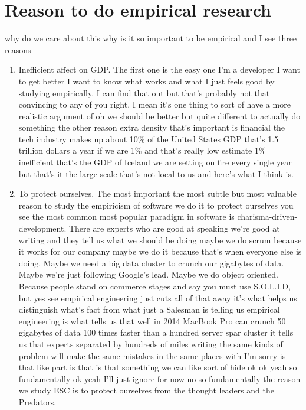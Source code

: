 \documentclass[conference, compsoc, twoside]{IEEEtran}
\begin{document}
\section{Reason to do empirical research} %
why do we care about this why is it so important to be empirical and I see three reasons
\begin{enumerate}
  \item Inefficient affect on GDP.
The first one is the easy one I'm a
developer I want to get better I want to
know what works and what I just feels
good by studying empirically.
I can find that out but that's probably not that convincing to any of you right.
I mean it's one thing to sort of have a more realistic argument of oh we should be better but quite different to actually do something the other reason extra density that's
important is financial the tech industry makes up about 10\% of the United States GDP that's 1.5 trillion dollars a year
if we are 1\% and that's really low estimate 1\% inefficient that's the GDP of Iceland we are setting on fire every single year but that's it the large-scale that's not local to us and here's what I think is.
  \item To protect ourselves.
The most important the most subtle but most valuable reason to study the empiricism of software we do it to protect
ourselves you see the most common most popular paradigm in software is charisma-driven-development.
There are experts who are good at speaking we're good at writing and they tell us what we should be doing maybe we do scrum because it works for our company maybe we do it
because that's when everyone else is doing. 
Maybe we need a big data cluster to crunch our gigabytes of data.
Maybe we're just following Google's lead.
Maybe we do object oriented.
Because people stand on commerce stages and say you must use S.O.L.I.D, but yes see empirical engineering just cuts all of
that away it's what helps us distinguish
what's fact from what just a Salesman is
telling us empirical engineering is what
tells us that well in 2014 MacBook Pro
can crunch 50 gigabytes of data 100
times faster than a hundred server spar
cluster it tells us that experts separated by hundreds of miles writing the same kinds of problem will make the same mistakes in the same places with I'm sorry is that like part is that is that something we can like sort of hide ok ok yeah so fundamentally ok yeah I'll just ignore for now no so fundamentally the reason we study ESC is to protect ourselves from the thought leaders and the Predators.
\end{enumerate}
\end{document}
